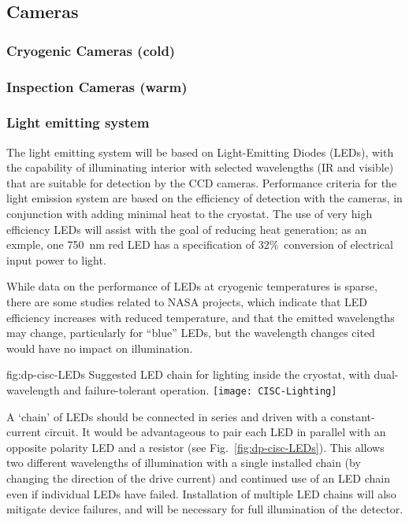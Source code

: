 \subsection{Cameras}
\label{sec:fddp-slow-cryo-cameras}


\subsubsection{Cryogenic Cameras (cold)}

\subsubsection{Inspection Cameras (warm)}

\subsubsection{Light emitting system}
The light emitting system will be based on Light-Emitting Diodes (LEDs),
with the capability of illuminating interior with selected wavelengths
(IR and visible) that are suitable for detection by the CCD cameras.
Performance criteria for the light emission system are based on the
efficiency of detection with the cameras, in conjunction with adding
minimal heat to the cryostat. The use of very high efficiency LEDs will
assist with the goal of reducing heat generation; as an exmple, one
\SI{750}{nm}
red LED has a specification of 32\%\ conversion of
electrical input power to light. 

While data on the performance of LEDs at cryogenic temperatures is sparse,
there are some studies related to NASA projects\cite{Carron:2017zzz}, which
indicate that LED efficiency increases with reduced temperature,
and that the emitted wavelengths may change, particularly for ``blue'' LEDs,
but the wavelength changes cited would have no impact on illumination.

\begin{dunefigure}{fig:dp-cisc-LEDs}
  {Suggested LED chain for lighting inside the cryostat, with
    dual-wavelength and failure-tolerant operation.}
\texttt{[image: CISC-Lighting]}
\end{dunefigure}


A `chain' of LEDs should be connected in series and driven with a
constant-current circuit. It would be advantageous to pair each
LED in parallel with an opposite polarity LED and a resistor
(see Fig.~\ref{fig:dp-cisc-LEDs}).
This allows two different wavelengths of illumination with a single installed
chain (by changing the direction of the drive current) and 
continued use of an LED chain even if individual LEDs have failed.
Installation of multiple LED chains will also mitigate device failures,
and will be necessary for full illumination of the detector.
